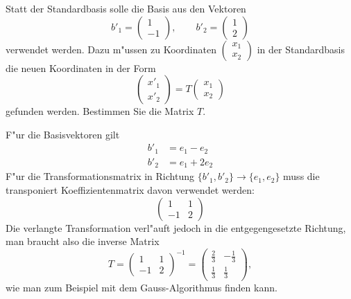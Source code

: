Statt der Standardbasis solle die Basis aus den Vektoren
\[
b'_1 = \begin{pmatrix}1\\-1\end{pmatrix},\qquad
b'_2 = \begin{pmatrix}1\\2\end{pmatrix}
\]
verwendet werden.
Dazu m"ussen zu Koordinaten
$\begin{pmatrix}x_1\\x_2\end{pmatrix}$ in der Standardbasis
die neuen Koordinaten in der Form
\[
\begin{pmatrix}x'_1\\x'_2\end{pmatrix}=T
\begin{pmatrix}x_1\\x_2\end{pmatrix}
\]
gefunden werden. Bestimmen Sie die Matrix $T$.

\begin{loesung}
F"ur die Basisvektoren gilt
\begin{align*}
b'_1&=e_1-e_2\\
b'_2&=e_1+2e_2
\end{align*}
F"ur die Transformationsmatrix in Richtung
$\{b'_1,b'_2\}\to\{e_1,e_2\}$ muss die transponiert
Koeffizientenmatrix  davon verwendet werden:
\[
\begin{pmatrix}
1&1\\-1&2
\end{pmatrix}
\]
Die verlangte Transformation verl"auft jedoch in die entgegengesetzte
Richtung, man braucht also die inverse Matrix
\[
T=
\begin{pmatrix}
1&1\\-1&2
\end{pmatrix}^{-1}
=
\begin{pmatrix}
\frac23&-\frac13\\
\frac13&\frac13
\end{pmatrix},
\]
wie man zum Beispiel mit dem Gauss-Algorithmus finden kann.
\end{loesung}

